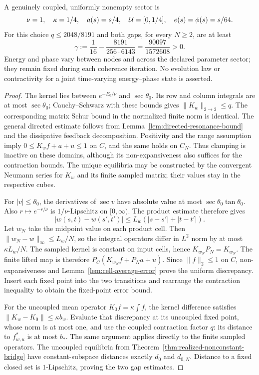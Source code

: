 \begin{proposition}
A genuinely coupled, uniformly nonempty sector is
\[
 \nu=1,\quad\kappa=1/4,\quad a(s)=s/4,\quad\mathcal{U}=[0,1/4],
 \quad e(s)=\phi(s)=s/64.
\]
For this choice $q\leq2048/8191$ and both gaps, for every $N\geq2$, are at least
\[
 \gamma:=\frac1{16}-\frac{8191}{256\cdot6143}
          =\frac{90097}{1572608}>0.
\]
Energy and phase vary between nodes and across the declared parameter sector;
they remain fixed during each coherence iteration. No evolution law or
contractivity for a joint time-varying energy--phase state is asserted.
\end{proposition}

\begin{proof}
The kernel lies between $e^{-E_0/\nu}$ and $\sec\theta_0$. Its row and column
integrals are at most $\sec\theta_0$; Cauchy--Schwarz with these bounds gives
$\|K_w\|_{2\to2}\leq q$. The corresponding matrix Schur bound in the normalized
finite norm is identical. The general directed estimate follows from
Lemma~\ref{lem:directed-resonance-bound} and the dissipative feedback decomposition.
Positivity and the range assumption imply $0\leq K_wf+a+u\leq1$ on $C$,
and the same holds on $C_N$. Thus clamping is inactive on these domains,
although its non-expansiveness also suffices for the contraction bounds.
The unique equilibria may be constructed by the convergent Neumann series
for $K_w$ and its finite sampled matrix; their values stay in the respective cubes.

For $|v|\leq\theta_0$, the derivatives of $\sec v$ have absolute value at most
$\sec\theta_0\tan\theta_0$. Also $r\mapsto e^{-r/\nu}$ is $1/\nu$-Lipschitz
on $[0,\infty)$. The product estimate therefore gives
\[
 |w(s,t)-w(s',t')|
 \leq L_w(|s-s'|+|t-t'|).
\]
Let $w_N$ take the midpoint value on each product cell. Then
$\|w_N-w\|_\infty\leq L_w/N$, so the integral operators differ in $L^2$ norm
by at most $\kappa L_w/N$. The sampled kernel is constant on input cells,
hence $K_{w_N}P_N=K_{w_N}$. The finite lifted map is therefore
$P_C(K_{w_N}f+P_Na+u)$. Since $\|f\|_2\leq1$ on $C$, non-expansiveness and
Lemma~\ref{lem:cell-average-error} prove the uniform discrepancy.
Insert each fixed point into the two transitions and rearrange the contraction
inequality to obtain the fixed-point error bound.

For the uncoupled mean operator $K_0f=\kappa\int f$, the kernel difference
satisfies $\|K_w-K_0\|\leq\kappa b_w$. Evaluate that discrepancy at its
uncoupled fixed point, whose norm is at most one, and use the coupled
contraction factor $q$: its distance to $f^*_{w,u}$ is at most $b_*$.
The same argument applies directly to the finite sampled operators.
The uncoupled equilibria from Theorem~\ref{thm:realized-nonconstant-bridge}
have constant-subspace distances exactly $d_0$ and $d_{0,N}$. Distance to a
fixed closed set is $1$-Lipschitz, proving the two gap estimates.


\end{proof}
